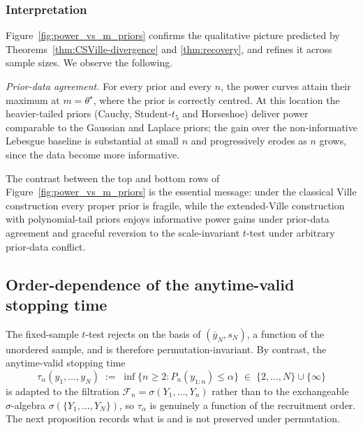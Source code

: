 \documentclass[numsec,webpdf,modern,medium,namedate]{oup-authoring-template}
\theoremstyle{thmstyleone}%
\theoremstyle{thmstyletwo}%
\theoremstyle{thmstylethree}%
\newcommand{\1}{\mathbf{1}}
\begin{document}
\subsubsection{Interpretation}\label{ssec:exp-interp}

Figure~\ref{fig:power_vs_m_priors} confirms the qualitative picture
predicted by Theorems~\ref{thm:CSVille-divergence} and \ref{thm:recovery}, and refines it across sample sizes. We observe the following.

\emph{Prior-data agreement.} For every prior and every \(n\), the power
curves attain their maximum at \(m=\theta^\star\), where the prior is
correctly centred. At this location the heavier-tailed priors (Cauchy, Student-$t_5$ and Horseshoe) deliver power comparable to the Gaussian and Laplace priors;
the gain over the non-informative Lebesgue baseline is substantial at
small \(n\) and progressively erodes as \(n\) grows, since the data become more informative.

The contrast between the top and bottom rows of Figure~\ref{fig:power_vs_m_priors} is the essential message: under the classical Ville construction every proper prior is fragile, while the
extended-Ville construction with polynomial-tail priors enjoys
informative power gains under prior-data agreement and graceful reversion to the scale-invariant \(t\)-test under arbitrary prior-data conflict.

\subsection{Order-dependence of the anytime-valid stopping time}
\label{sec:order-dependence}

The fixed-sample $t$-test rejects on the basis of $(\bar y_{N},s_{N})$, a function of the unordered sample, and is therefore permutation-invariant. By contrast, the anytime-valid stopping time
\[
   \tau_{\alpha}(y_{1},\ldots,y_{N}) \;:=\; \inf\bigl\{n\ge 2 : P_{n}(y_{1:n}) \le \alpha\bigr\} \;\in\; \{2,\ldots,N\}\cup\{\infty\}
\]
is adapted to the filtration $\mathcal{F}_{n}=\sigma(Y_{1},\ldots,Y_{n})$ rather than to the exchangeable $\sigma$-algebra $\sigma(\{Y_{1},\ldots,Y_{N}\})$, so $\tau_{\alpha}$ is genuinely a function of the recruitment order. The next proposition records what is and is not preserved under permutation.
\end{document}

